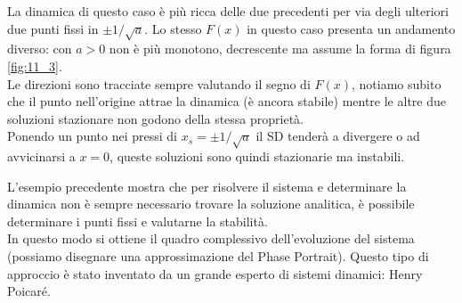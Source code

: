 \begin{exmp}
\begin{description}
{	        \label{fig:11_3}
	    }
	    La dinamica di questo caso è più ricca delle due precedenti per via degli ulteriori due punti fissi in $\pm 1 /\sqrt{a}$. Lo stesso $F(x)$ in questo caso presenta un andamento diverso: con $a>0$ non è più monotono, decrescente ma assume la forma di figura \ref{fig:11_3}.\\
	    Le direzioni sono tracciate sempre valutando il segno di $F(x)$, notiamo subito che il punto nell'origine attrae la dinamica (è ancora stabile) mentre le altre due soluzioni stazionare non godono della stessa proprietà.\\
	    Ponendo un punto nei pressi di $x_s = \pm 1 /\sqrt{a} $ il SD tenderà a divergere o ad avvicinarsi a $x=0$, queste soluzioni sono quindi stazionarie ma instabili.
    \end{description}
\end{exmp}
\noindent
L'esempio precedente mostra che per risolvere il sistema e determinare la dinamica non è sempre necessario trovare la soluzione analitica, è possibile determinare i punti fissi e valutarne la stabilità.\\
In questo modo si ottiene il quadro complessivo dell'evoluzione del sistema (possiamo disegnare una approssimazione del Phase Portrait). Questo tipo di approccio è stato inventato da un grande esperto di sistemi dinamici: Henry Poicaré.
